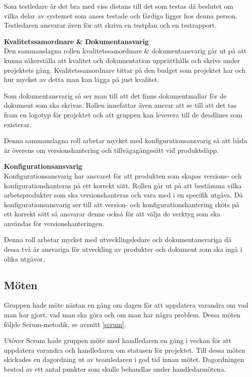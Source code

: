 Som testledare är det bra med viss distans till det som testas då beslutet om vilka delar av systemet som anses testade och färdiga ligger hos denna person. Testledaren ansvarar även för att skriva en testplan och en testrapport.

\textbf{Kvalitetssamordnare \& Dokumentansvarig}\\
Den sammanslagna rollen kvalitetssamordnare \& dokumentansvarig går ut på att kunna säkerställa att kvalitet och dokumentation upprätthålls och skrivs under projektets gång. Kvalitetssamordnare tittar på den budget som projektet har och hur mycket av detta man kan lägga på just kvalitet.

Som dokumentansvarig så ser man till att det finns dokumentmallar för de dokument som ska skrivas. Rollen innefattar även ansvar att se till att det tas fram en logotyp för projektet och att gruppen kan leverera till de deadlines som existerar.

Denna sammanslagna roll arbetar mycket med konfigurationsansvarig så att båda är överens om versionshantering och tillvägagångssätt vid produktsläpp.

\textbf{Konfigurationsansvarig}
\\Konfigurationsansvarig har ansvaret för att produkten som skapas versions- och konfigurationshanteras på ett korrekt sätt. Rollen går ut på att bestämma vilka arbetsprodukter som ska versionshanteras och vara med i en specifik utgåva. Då konfigurationsansvarig ser till att version- och konfigurationshantering sköts på ett korrekt sätt så ansvarar denne också för att välja de verktyg som ska användas för versionshanteringen.

Denna roll arbetar mycket med utvecklingsledare och dokumentansvariga då dessa två är ansvariga för utveckling av produkter och dokument som ska ingå i olika utgåvor.

\subsection{Möten}
Gruppen hade möte nästan en gång om dagen för att uppdatera varandra om vad man har gjort, vad man ska göra och om man har några problem. Dessa möten följde Scrum-metodik, se avsnitt \ref{scrum}.

Utöver Scrum hade gruppen möte med handledaren en gång i veckan för att uppdatera varandra och handledaren om statusen för projektet. Till dessa möten skickades en dagordning ut av teamledaren i god tid innan mötet. Dagordningen bestod av ett antal punkter som skulle behandlas under handledarmötena. 

